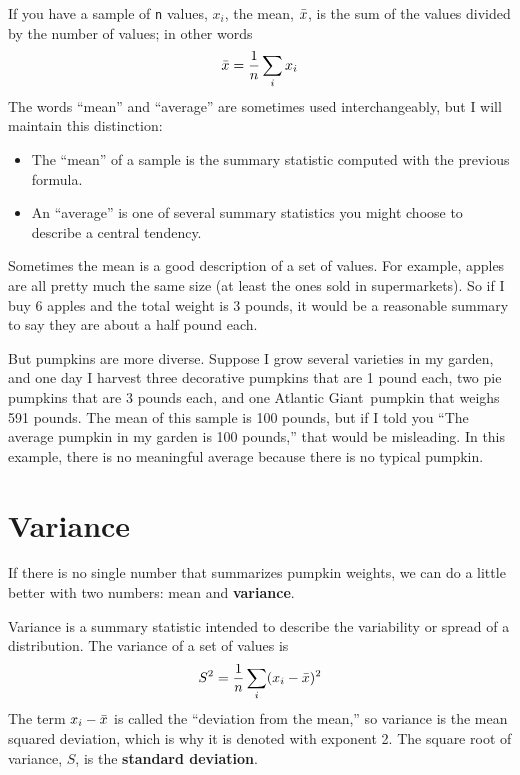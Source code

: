 \documentclass[12pt]{book}
\begin{document}
If you have a sample of {\tt n} values, $x_i$, the mean, $\bar{x}$, is
the sum of the values divided by the number of values; in other words
%
\[ \bar{x} = \frac{1}{n} \sum_i x_i \]
%
The words ``mean'' and ``average'' are sometimes used interchangeably,
but I will maintain this distinction:

\begin{itemize}

\item The ``mean'' of a sample is the summary statistic computed with
  the previous formula.

\item An ``average'' is one of several summary statistics you might
  choose to describe a central tendency.

\end{itemize}

Sometimes the mean is a good description of a set of values.  For
example, apples are all pretty much the same size (at least the ones
sold in supermarkets).  So if I buy 6 apples and the total weight is 3
pounds, it would be a reasonable summary to say they are about a half
pound each.

But pumpkins are more diverse.  Suppose I grow several varieties in my
garden, and one day I harvest three decorative pumpkins that are 1
pound each, two pie pumpkins that are 3 pounds each, and one Atlantic
Giant\textregistered~pumpkin that weighs 591 pounds.  The mean of this
sample is 100 pounds, but if I told you ``The average pumpkin in my
garden is 100 pounds,'' that would be misleading.  In this example,
there is no meaningful average because there is no typical pumpkin.



\section{Variance}

If there is no single number that summarizes pumpkin weights,
we can do a little better with two numbers: mean and {\bf variance}.

Variance is a summary statistic intended to describe the variability
or spread of a distribution.  The variance of a set of values is
%
\[ S^2 = \frac{1}{n} \sum_i (x_i - \bar{x})^2 \]
%
The term $x_i - \bar{x}$ is called the ``deviation from the mean,'' so
variance is the mean squared deviation, which is why it is denoted
with exponent 2.  The square root of variance, $S$, is the
{\bf standard deviation}.   
\end{document}

